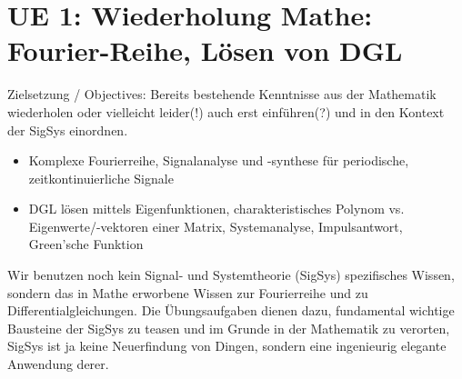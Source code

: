 \newpage
\section{UE 1: Wiederholung Mathe: Fourier-Reihe, Lösen von DGL}
\label{sec:ue1_intro}
Zielsetzung / Objectives: Bereits bestehende Kenntnisse aus der Mathematik
wiederholen oder vielleicht leider(!) auch erst einführen(?) und in den Kontext der SigSys einordnen.

\begin{itemize}
\item Komplexe Fourierreihe, Signalanalyse und -synthese für periodische, zeitkontinuierliche Signale
\item DGL lösen mittels Eigenfunktionen, charakteristisches Polynom vs. Eigenwerte/-vektoren einer Matrix, Systemanalyse, Impulsantwort, Green'sche Funktion
\end{itemize}
%
Wir benutzen noch kein Signal- und Systemtheorie (SigSys) spezifisches Wissen,
sondern das in Mathe erworbene Wissen zur Fourierreihe
und zu Differentialgleichungen. Die Übungsaufgaben dienen dazu, fundamental
wichtige Bausteine der SigSys zu teasen und im Grunde in der Mathematik zu verorten,
SigSys ist ja keine Neuerfindung von Dingen, sondern eine ingenieurig elegante
Anwendung derer.


\newpage

